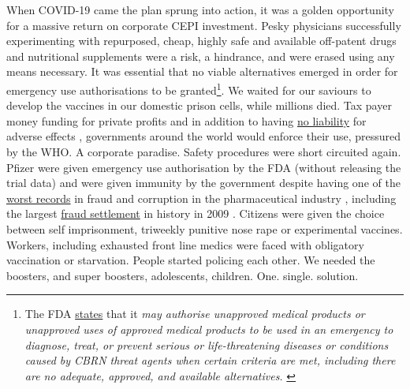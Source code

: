 \documentclass[11pt,a4paper,notitlepage]{report}
\begin{document}
When COVID-19 came the plan sprung into action, it was a golden opportunity for a massive return on corporate CEPI investment. Pesky physicians successfully experimenting with repurposed, cheap, highly safe and available off-patent drugs and nutritional supplements were a risk, a hindrance, and were erased using any means necessary. It was essential that no viable alternatives emerged in order for emergency use authorisations to be granted\footnote{The FDA \href{https://www.fda.gov/emergency-preparedness-and-response/mcm-legal-regulatory-and-policy-framework/emergency-use-authorization}{states} that it \textit{may authorise unapproved medical products or unapproved uses of approved medical products to be used in an emergency to diagnose, treat, or prevent serious or life-threatening diseases or conditions caused by CBRN threat agents when certain criteria are met, including there are no adequate, approved, and available alternatives.} \cite{fda-eua}}. We waited for our saviours to develop the vaccines in our domestic prison cells, while millions died. Tax payer money funding for private profits and in addition to having \href{https://www.cnbc.com/2020/12/16/covid-vaccine-side-effects-compensation-lawsuit.html}{no liability} for adverse effects \cite{cnbc17122020}, governments around the world would enforce their use, pressured by the WHO. A corporate paradise. Safety procedures were short circuited again. Pfizer were given emergency use authorisation by the FDA (without releasing the trial data) and were given immunity by the government despite having one of the \href{https://www.ncbi.nlm.nih.gov/pmc/articles/PMC2875889/}{worst records} in fraud and corruption in the pharmaceutical industry \cite{evans052010}, including the largest \href{https://www.justice.gov/opa/pr/justice-department-announces-largest-health-care-fraud-settlement-its-history}{fraud settlement} in history in 2009 \cite{pfizer-fraud-settlement}. Citizens were given the choice between self imprisonment, triweekly punitive nose rape or experimental vaccines. Workers, including exhausted front line medics were faced with obligatory vaccination or starvation. People started policing each other. We needed the boosters, and super boosters, adolescents, children. One. single. solution.
\end{document}
